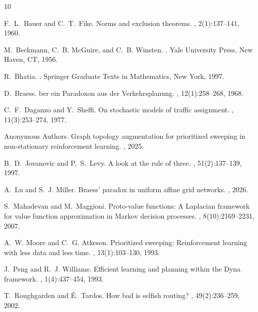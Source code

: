 \documentclass[11pt,a4paper]{article}
\begin{document}

\begin{thebibliography}{10}

F.~L.~Bauer and C.~T.~Fike.
\newblock Norms and exclusion theorems.
, 2(1):137--141, 1960.

M.~Beckmann, C.~B. McGuire, and C.~B. Winsten.
.
\newblock Yale University Press, New Haven, CT, 1956.

R.~Bhatia.
.
\newblock Springer Graduate Texts in Mathematics, New York, 1997.

D.~Braess.
ber ein {P}aradoxon aus der {V}erkehrsplanung.
, 12(1):258--268, 1968.

C.~F.~Daganzo and Y.~Sheffi.
\newblock On stochastic models of traffic assignment.
, 11(3):253--274, 1977.

Anonymous Authors.
\newblock Graph topology augmentation for prioritized sweeping in non-stationary reinforcement learning.
, 2025.

B.~D.~Jovanovic and P.~S.~Levy.
\newblock A look at the rule of three.
, 51(2):137--139, 1997.

A.~Lu and S.~J. Miller.
\newblock Braess' paradox in uniform affine grid networks.
, 2026.

S.~Mahadevan and M.~Maggioni.
\newblock Proto-value functions: A {L}aplacian framework for value function approximation in {M}arkov decision processes.
, 8(10):2169--2231, 2007.

A.~W. Moore and C.~G. Atkeson.
\newblock Prioritized sweeping: Reinforcement learning with less data and less time.
, 13(1):103--130, 1993.

J.~Peng and R.~J. Williams.
\newblock Efficient learning and planning within the Dyna framework.
, 1(4):437--454, 1993.

T.~Roughgarden and {\'E}.~Tardos.
\newblock How bad is selfish routing?
, 49(2):236--259, 2002.


\end{thebibliography}
\end{document}

